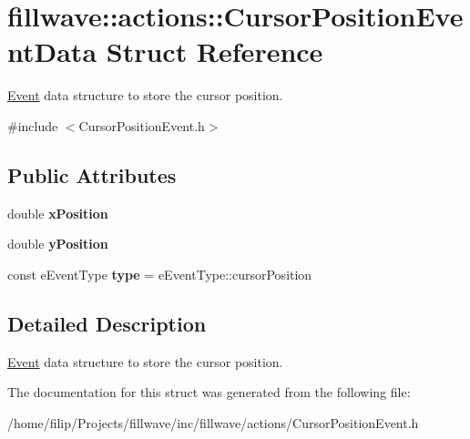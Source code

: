 \hypertarget{structfillwave_1_1actions_1_1CursorPositionEventData}{}\section{fillwave\+:\+:actions\+:\+:Cursor\+Position\+Event\+Data Struct Reference}
\label{structfillwave_1_1actions_1_1CursorPositionEventData}


\hyperlink{classfillwave_1_1actions_1_1Event}{Event} data structure to store the cursor position.  




{\ttfamily \#include $<$Cursor\+Position\+Event.\+h$>$}

\subsection*{Public Attributes}
\begin{DoxyCompactItemize}
\item 
\hypertarget{structfillwave_1_1actions_1_1CursorPositionEventData_a2288026e8ab47bdbb1d161d03dfe70e6}{}double {\bfseries x\+Position}\label{structfillwave_1_1actions_1_1CursorPositionEventData_a2288026e8ab47bdbb1d161d03dfe70e6}

\item 
\hypertarget{structfillwave_1_1actions_1_1CursorPositionEventData_ac28fd3e33ba694248f8f9f024083e85e}{}double {\bfseries y\+Position}\label{structfillwave_1_1actions_1_1CursorPositionEventData_ac28fd3e33ba694248f8f9f024083e85e}

\item 
\hypertarget{structfillwave_1_1actions_1_1CursorPositionEventData_af764853b95496bdfd47a1019a5af8a46}{}const e\+Event\+Type {\bfseries type} = e\+Event\+Type\+::cursor\+Position\label{structfillwave_1_1actions_1_1CursorPositionEventData_af764853b95496bdfd47a1019a5af8a46}

\end{DoxyCompactItemize}


\subsection{Detailed Description}
\hyperlink{classfillwave_1_1actions_1_1Event}{Event} data structure to store the cursor position. 

The documentation for this struct was generated from the following file\+:\begin{DoxyCompactItemize}
\item 
/home/filip/\+Projects/fillwave/inc/fillwave/actions/Cursor\+Position\+Event.\+h\end{DoxyCompactItemize}
